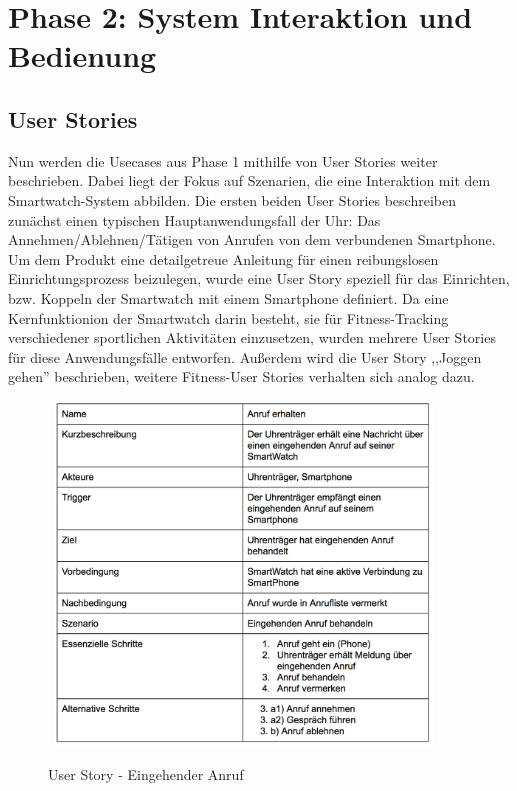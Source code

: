 \chapter{Phase 2: System Interaktion und Bedienung}

\section{User Stories}

Nun werden die Usecases aus Phase 1 mithilfe von User Stories weiter beschrieben. Dabei liegt der Fokus auf Szenarien, die eine Interaktion mit dem Smartwatch-System abbilden.
Die ersten beiden User Stories beschreiben zunächst einen typischen Hauptanwendungsfall der Uhr: Das Annehmen/Ablehnen/Tätigen von Anrufen von dem verbundenen Smartphone.
Um dem Produkt eine detailgetreue Anleitung für einen reibungslosen Einrichtungsprozess beizulegen, wurde eine User Story speziell für das Einrichten, bzw. Koppeln der Smartwatch mit einem Smartphone definiert.
Da eine Kernfunktionion der Smartwatch darin besteht, sie für Fitness-Tracking verschiedener sportlichen Aktivitäten einzusetzen, wurden mehrere User Stories für diese Anwendungsfälle entworfen. Außerdem wird die User Story ,,Joggen gehen'' beschrieben, weitere Fitness-User Stories verhalten sich analog dazu.
\begin{figure}[H]
\centering\
\includegraphics[width=10cm]{img/story_in}
\caption{User Story - Eingehender Anruf}\label{fig:story-in}
\end{figure}
